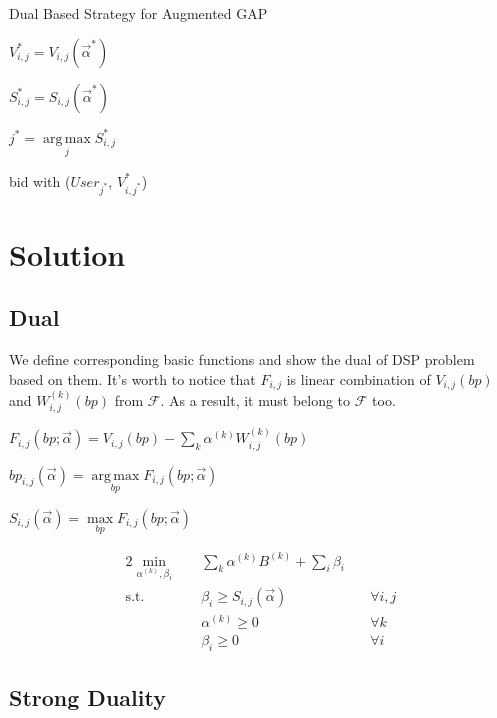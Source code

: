 \documentclass[sigconf]{acmart}
\DeclareMathOperator*{\argmax}{arg\,max}
\newcommand{\sumi}{\sum\limits_i}
\newcommand{\sumk}{\sum\limits_k}
\newcommand{\sbp}{bp_{i,j}}
\newcommand{\sV}{V_{i,j}}
\newcommand{\sW}{W_{i,j}^{(k)}}
\newcommand{\sB}{B^{(k)}}
\newcommand{\salpha}{\alpha^{(k)}}
\newcommand{\sbeta}{\beta_i}
\newcommand{\sF}{F_{i,j}}
\newcommand{\sS}{S_{i,j}}
\newcommand{\valpha}{\vec{\alpha}}
\newcommand{\uff}{\mathscr{F}}
\newcommand{\scoreconstraint}{\sbeta \ge \sS(\vec{\alpha})}
\begin{document}
\begin{algorithm}
\caption{Dual Based Strategy for Augmented GAP}

{
  {
    $\sV^* = \sV(\valpha^*)$

    $\sS^* = \sS(\valpha^*)$
  }
  $j^* = \argmax\limits_j \sS^*$
  
   { bid with ($User_{j^*}$, $V_{i,j^*}^*$) }
}
\end{algorithm}

\section{Solution}

\subsection{Dual}

We define corresponding basic functions and show the dual of DSP problem based on them.
It's worth to notice that $\sF$ is linear combination of $\sV(bp)$ and $\sW(bp)$ from $\uff$.
As a result, it must belong to $\uff$ too.

\begin{definition}
$\sF(bp; \valpha) = \sV(bp) - \sumk \salpha \sW(bp)$
\end{definition}

\begin{definition}
$\sbp(\valpha) = \argmax\limits_{bp} \sF(bp; \valpha)$
\end{definition}

\begin{definition}
$\sS(\valpha) = \max\limits_{bp} \sF(bp; \valpha)$
\end{definition}

\begin{alignat}{2}
    \min\limits_{\salpha, \sbeta} \quad & \sumk \salpha \sB + \sumi \sbeta \quad & {} \\
    \mbox{s.t.} \quad                   & \scoreconstraint \quad                 & \forall i,j \\
    \quad                               & \salpha \ge 0 \quad                    & \forall k \\
    \quad                               & \sbeta \ge 0 \quad                     & \forall i
\end{alignat}

\subsection{Strong Duality}
\end{document}
